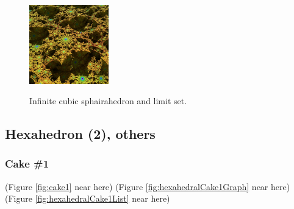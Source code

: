 \documentclass[suppldata, dvipdfmx]{interact}
\theoremstyle{plain}%
\theoremstyle{definition}
\theoremstyle{remark}
\theoremstyle{problemstyle}
\begin{document}
\begin{figure}[h!tbp]
\begin{minipage}{0.5\textwidth}
  \hspace*{\fill}
  \begin{minipage}[t]{0.24\textwidth}
   \centering
   \includegraphics[width=1.35in, height=1.35in,
   keepaspectratio]{./img/sphairahedron/cube/limitsetInf.jpg} 
   \label{fig:cubeInfiniteLimitset}
  \end{minipage}
  \hspace*{\fill}
  \caption{Infinite cubic sphairahedron and limit set.}
  \label{fig:cubeInf}
  \end{minipage}
\end{figure}


\subsection{Hexahedron (2), others}


\subsubsection{Cake \#1}

\noindent(Figure \ref{fig:cake1} near here)
(Figure \ref{fig:hexahedralCake1Graph} near here)\\
(Figure \ref{fig:hexahedralCake1List}
 near here)
\end{document}
